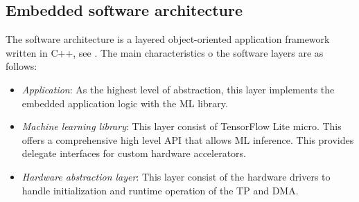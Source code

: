 \subsection{Embedded software architecture}
The software architecture is a layered object-oriented application framework written in C++, see . The main characteristics o the software layers are as follows:
\begin{itemize}
	\item \emph{Application}: As the highest level of abstraction, this layer implements the embedded application logic with the ML library.
	\item \emph{Machine learning library}: This layer consist of TensorFlow Lite micro. This offers a comprehensive high level API that allows ML inference. This provides delegate interfaces for custom hardware accelerators.
	\item \emph{Hardware abstraction layer}: This layer consist of the hardware drivers to handle initialization and runtime operation of the TP and DMA.
\end{itemize}